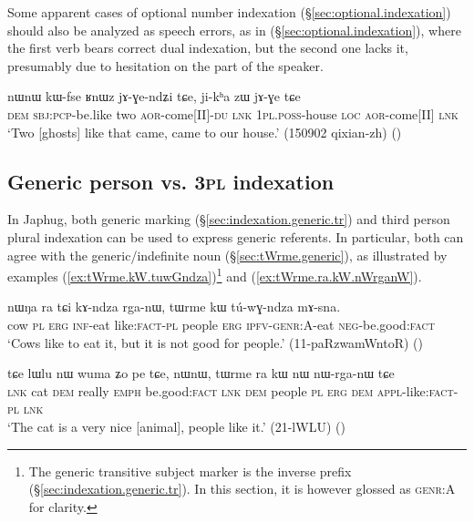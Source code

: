 Some apparent cases of optional number indexation (§\ref{sec:optional.indexation}) should also be analyzed as speech errors, as in (§\ref{sec:optional.indexation}), where the first verb  bears correct dual indexation, but the second one lacks it, presumably due to hesitation on the part of the speaker.

\begin{exe}
\ex \label{ex:jAGendZi.du}
\gll   nɯnɯ kɯ-fse ʁnɯz jɤ-ɣe-ndʑi tɕe,  ji-kʰa zɯ jɤ-ɣe tɕe \\
\textsc{dem} \textsc{sbj}:\textsc{pcp}-be.like two \textsc{aor}-come[II]-\textsc{du} \textsc{lnk}  \textsc{1pl}.\textsc{poss}-house \textsc{loc} \textsc{aor}-come[II] \textsc{lnk} \\
\glt `Two [ghosts] like that came, came to our house.' (150902 qixian-zh) ()
\end{exe} 

\subsection{Generic person vs. \textsc{3pl} indexation} \label{sec:genr.3pl}
In Japhug, both generic marking (§\ref{sec:indexation.generic.tr}) and third person plural indexation can be used to express generic referents. In particular, both can agree with the generic/indefinite noun  (§\ref{sec:tWrme.generic}), as illustrated by examples (\ref{ex:tWrme.kW.tuwGndza})\footnote{The generic transitive subject marker is the inverse prefix (§\ref{sec:indexation.generic.tr}). In this section, it is however glossed as \textsc{genr}:A for clarity. } and (\ref{ex:tWrme.ra.kW.nWrganW}).


\begin{exe}
\ex   \label{ex:tWrme.kW.tuwGndza}
 \gll nɯŋa ra tɕi kɤ-ndza rga-nɯ, tɯrme kɯ tú-wɣ-ndza mɤ-sna. \\
cow \textsc{pl} \textsc{erg} \textsc{inf}-eat like:\textsc{fact}-\textsc{pl} people \textsc{erg} \textsc{ipfv}-\textsc{genr}:\textsc{A}-eat \textsc{neg}-be.good:\textsc{fact} \\
\glt `Cows like to eat it, but it is not good for people.' (11-paRzwamWntoR)
()
\end{exe}

\begin{exe}
\ex   \label{ex:tWrme.ra.kW.nWrganW}
 \gll  tɕe lɯlu nɯ wuma ʑo pe tɕe, nɯnɯ, tɯrme ra kɯ nɯ nɯ-rga-nɯ tɕe \\
\textsc{lnk} cat \textsc{dem} really \textsc{emph} be.good:\textsc{fact} \textsc{lnk} \textsc{dem} people \textsc{pl} \textsc{erg} \textsc{dem} \textsc{appl}-like:\textsc{fact}-\textsc{pl} \textsc{lnk} \\
\glt `The cat is a very nice [animal], people like it.' (21-lWLU)
()
\end{exe}

